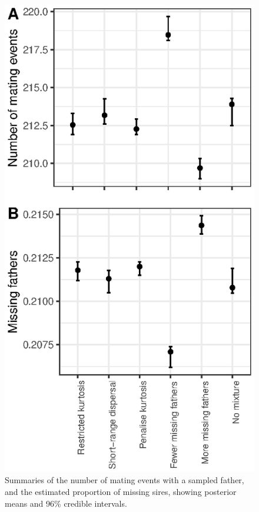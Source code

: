 \documentclass[10pt, a4paper, twocolumn]{article} %
\begin{document}
\begin{figure}
\includegraphics{mating_events.eps}
\caption{Summaries of the number of mating events with a sampled father, and the estimated proportion of missing sires, showing posterior means and 96\% credible intervals.}
\label{fig:mating_events}
\end{figure}
\end{document}
